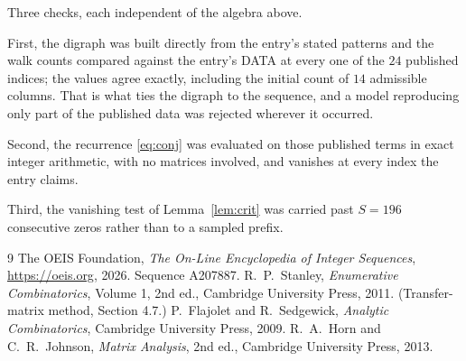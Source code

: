 \documentclass[11pt,a4paper]{article}
\theoremstyle{plain}
\theoremstyle{definition}
\begin{document}
Three checks, each independent of the algebra above.

First, the digraph was built directly from the entry's stated patterns and the walk counts
compared against the entry's DATA at every one of the $24$ published indices; the
values agree exactly, including the initial count of $14$ admissible columns. That is
what ties the digraph to the sequence, and a model reproducing only part of the published
data was rejected wherever it occurred.

Second, the recurrence \eqref{eq:conj} was evaluated on those published terms in exact
integer arithmetic, with no matrices involved, and vanishes at every index the entry claims.

Third, the vanishing test of Lemma~\ref{lem:crit} was carried past $S=196$ consecutive
zeros rather than to a sampled prefix.

\begin{thebibliography}{9}
 The OEIS Foundation, \emph{The On-Line Encyclopedia of Integer
Sequences}, \url{https://oeis.org}, 2026. Sequence A207887.
 R.~P.~Stanley, \emph{Enumerative Combinatorics}, Volume 1, 2nd ed.,
Cambridge University Press, 2011. (Transfer-matrix method, Section 4.7.)
 P.~Flajolet and R.~Sedgewick, \emph{Analytic Combinatorics}, Cambridge
University Press, 2009.
 R.~A.~Horn and C.~R.~Johnson, \emph{Matrix Analysis}, 2nd ed., Cambridge
University Press, 2013.
\end{thebibliography}
\end{document}
